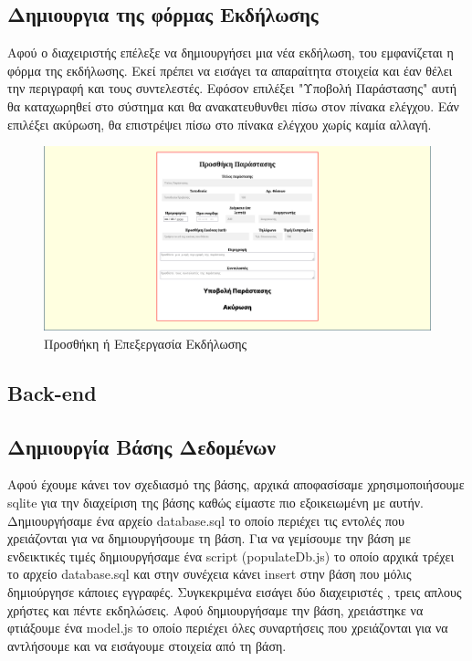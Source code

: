 \documentclass{acmart}
\begin{document}
\subsection*{Δημιουργια της φόρμας Εκδήλωσης}
Αφού ο διαχειριστής επέλεξε να δημιουργήσει μια νέα εκδήλωση, του εμφανίζεται η φόρμα της εκδήλωσης. 
Εκεί πρέπει να εισάγει τα απαραίτητα στοιχεία και έαν θέλει την περιγραφή και τους συντελεστές. 
Εφόσον επιλέξει "Υποβολή Παράστασης" αυτή θα καταχωρηθεί στο σύστημα και θα ανακατευθυνθει πίσω 
στον πίνακα ελέγχου. Εάν επιλέξει ακύρωση, θα επιστρέψει πίσω στο πίνακα ελέγχου χωρίς καμία αλλαγή.
\begin{figure}[H]
       \includegraphics[width=\textwidth]{edit.png}
       \caption{Προσθήκη ή Επεξεργασία Εκδήλωσης}
       \label{fig:edit}
\end{figure}
\subsection{Back-end}
\subsection*{Δημιουργία Βάσης Δεδομένων}
Αφού έχουμε κάνει τον σχεδιασμό της βάσης, αρχικά αποφασίσαμε χρησιμοποιήσουμε sqlite για την διαχείριση της βάσης καθώς
είμαστε πιο εξοικειωμένη με αυτήν.
Δημιουργήσαμε ένα αρχείο database.sql το οποίο περιέχει τις εντολές που χρειάζονται για να δημιουργήσουμε τη βάση.
Για να γεμίσουμε την βάση με ενδεικτικές τιμές δημιουργήσαμε ένα script (populateDb.js) το οποίο αρχικά τρέχει το αρχείο
database.sql και στην συνέχεια κάνει insert στην βάση που μόλις δημιούργησε κάποιες εγγραφές.
Συγκεκριμένα εισάγει δύο διαχειριστές , τρεις απλους χρήστες και πέντε εκδηλώσεις.
Αφού δημιουργήσαμε την βάση, χρειάστηκε να φτιάξουμε ένα model.js το οποίο περιέχει όλες συναρτήσεις που χρειάζονται
για να αντλήσουμε και να εισάγουμε στοιχεία από τη βάση.
\end{document}
